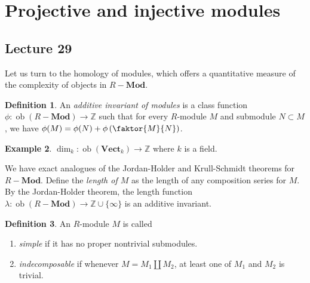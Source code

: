 \documentclass[10pt,letterpaper,cm]{nupset}
\theoremstyle{definition}
\newtheorem{definition}{Definition}[subsection]
\newtheorem{exmp}[definition]{Example}
\theoremstyle{theorem}
\theoremstyle{remark}
\newcommand{\Z}{\mathbb Z}
\newcommand{\1}{\mathbf{1}}
\newcommand{\0}{\vec 0}
\DeclareMathOperator{\ob}{ob}
\begin{document}
\section{Projective and injective modules}

\subsection{Lecture 29}

Let us 
turn to the homology of modules, which offers a quantitative measure of the complexity of objects in $R{-}\mathbf{Mod}$.


\begin{definition}
An \textit{additive invariant of modules} is a class function $\phi : \ob(R{-} \mathbf{Mod}) \to \Z$ such that for every $R$-module $M$ and submodule $N\subset M$, we have $\phi(M) = \phi(N) + \phi \left(\faktor{M}{N} \right)$. 
\end{definition}

\begin{exmp} 
 $\dim_k : \ob(\mathbf{Vect}_k) \to \Z$ where $k$ is a field.
\end{exmp}

\smallskip

We have exact analogues of the Jordan-Holder and Krull-Schmidt theorems for $R{-}\mathbf{Mod}$. Define the \textit{length of $M$} as the length of any composition series for $M$. By the Jordan-Holder theorem, the length function $\lambda : \ob(R{-} \mathbf{Mod}) \to \Z \cup \{\infty\}$ is an additive invariant.



\begin{definition} An $R$-module $M$ is called
\begin{enumerate}
\item \textit{simple} if it has no proper nontrivial submodules.
\item \textit{indecomposable} if whenever $M = M_1 \coprod M_2$, at least one of $M_1$ and $M_2$ is trivial.
\end{enumerate}
\end{definition}
\end{document}
